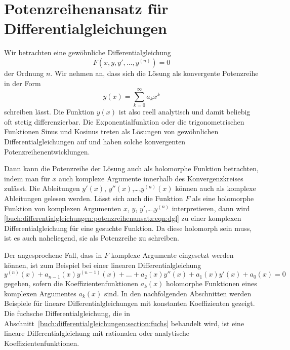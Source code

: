 %
%
%
\section{Potenzreihenansatz für Differentialgleichungen
\label{buch:differentialgleichungen:section:potenzreihen}}
Wir betrachten eine gewöhnliche Differentialgleichung
\begin{equation}
F(x,y,y',\dots,y^{(n)}) = 0
\label{buch:differentialgleichungen:potenzreihenansatz:eqn:dgl}
\end{equation}
der Ordnung $n$.
Wir nehmen an, dass sich die Lösung als konvergente Potenzreihe in
der Form
\begin{equation}
y(x)
=
\sum_{k=0}^\infty a_kx^k
\label{buch:differentialgleichungen:potenzreihen:eqn:ansatz}
\end{equation}
schreiben lässt.
Die Funktion $y(x)$ ist also reell analytisch und damit beliebig
oft stetig differenzierbar.
Die Exponentialfunktion oder die trigonometrischen Funktionen Sinus
und Kosinus treten als Lösungen von gewöhnlichen Differentialgleichungen
auf und haben solche konvergenten Potenzreihenentwicklungen.

Dann kann die Potenzreihe der Lösung auch als holomorphe Funktion
betrachten, indem man für $x$ auch komplexe Argumente innerhalb des
Konvergenzkreises zulässt.
Die Ableitungen $y'(x)$, $y''(x)$,\dots,$y^{(n)}(x)$ können auch
als komplexe Ableitungen gelesen werden.
Lässt sich auch die Funktion $F$ als eine holomorphe Funktion von
komplexen Argumenten $x$, $y$, $y'$,\dots,$y^{(n)}$ interpretieren,
dann wird
\eqref{buch:differentialgleichungen:potenzreihenansatz:eqn:dgl}
zu einer komplexen Differentialgleichung für eine gesuchte
Funktion.
Da diese holomorph sein muss, ist es auch naheliegend, sie als
Potenzreihe zu schreiben.

Der angesprochene Fall, dass in $F$ komplexe Argumente eingesetzt
werden können, ist zum Beispiel bei einer linearen Differentialgleichung
\[
y^{(n)}(x)
+
a_{n-1}(x) y^{(n-1)}(x)
+
\dots
+
a_2(x) y''(x)
+
a_1(x) y'(x)
+
a_0(x)
=
0
\]
gegeben, sofern die Koeffizientenfunktionen $a_k(x)$ holomorphe Funktionen
eines komplexen Argumentes $a_k(x)$ sind.
In den nachfolgenden Abschnitten werden Beispiele für lineare
Differentialgleichungen mit konstanten Koeffizienten gezeigt.
Die fuchsche Differentialgleichung, die in
Abschnitt~\ref{buch:differentialgleichungen:section:fuchs} behandelt wird,
ist eine lineare Differentialgleichung mit
rationalen oder analytische Koeffizientenfunktionen.





